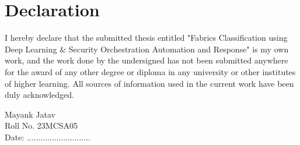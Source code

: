 
\chapter*{Declaration}
\thispagestyle{empty}


\vspace{1cm}
\nohyphens{I hereby declare that the submitted thesis entitled "Fabrics Classification using Deep Learning \& Security Orchestration Automation and Response" is my own work, and the work done by the undersigned has not been submitted anywhere for the award of any other degree or diploma in any university or other institutes of higher learning. All sources of information used in the current work have been duly acknowledged.
}


\vspace*{3cm}
\begin{flushright}
    
	Mayank Jatav	\\
	\vspace*{0.2cm}
        Roll No. 23MCSA05\\
	 Date: ............................

\end{flushright}

